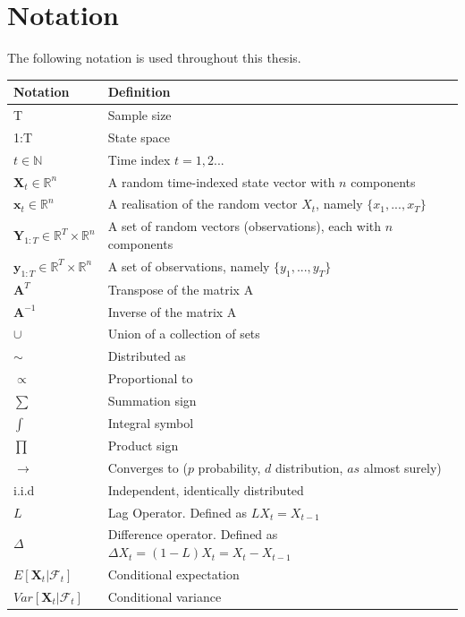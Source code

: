 \documentclass[11pt,a4,twosided,singlespacing,titlepagenumber=on]{scrreprt}
\newcommand{\matr}[1]{\mathbf{#1}} %
\numberwithin{equation}{chapter} %
\theoremstyle{remark}
\begin{document}
\chapter*{Notation}
The following notation is used throughout this thesis.
\begin{table}[h]
\centering
\begin{tabular}{ll}
\hline
\multicolumn{1}{|l|}{Notation}   	& \multicolumn{1}{l|}{Definition} \\ \hline
T									& Sample size \\
1:T									& State space \\
$t \in \mathbb{N}$ 					& Time index $t = {1,2...}$ \\
$\matr{X}_t	\in \mathbb{R}^n$				& A random time-indexed state vector with $n$ components \\
$\matr{x}_t	\in \mathbb{R}^n$				& A realisation of the random vector $X_t$, namely $\{x_1,...,x_T \}$ \\
$\matr{Y}_{1:T} \in \mathbb{R}^T \times \mathbb{R}^n$  		& A set of random vectors (observations), each with $n$ components \\
$\matr{y}_{1:T} \in \mathbb{R}^T \times \mathbb{R}^n $  		& A set of observations, namely $\{y_1,...,y_T \}$ \\
$\matr{A}^T$								& Transpose of the matrix A \\
$\matr{A}^{-1}$							& Inverse of the matrix A \\
$\cup$								& Union of a collection of sets \\
$\sim$								& Distributed as \\
$\propto$							& Proportional to \\
$\sum$								& Summation sign \\
$\int$								& Integral symbol \\
$\prod$								& Product sign \\
$\rightarrow$						& Converges to ($p$ probability, $d$ distribution, $as$ almost surely) \\
i.i.d								& Independent, identically distributed \\
$L$									& Lag Operator. Defined as $L X_t = X_{t-1}$ \\
$\Delta$							& Difference operator. Defined as $\Delta X_t = (1-L) X_t = X_t - X_{t-1}$ \\
$E[\matr{X}_t | \mathcal{F}_t]$			& Conditional expectation \\
$Var[\matr{X}_t | \mathcal{F}_t]$			& Conditional variance \\

\end{tabular}
\end{table}
\end{document}
